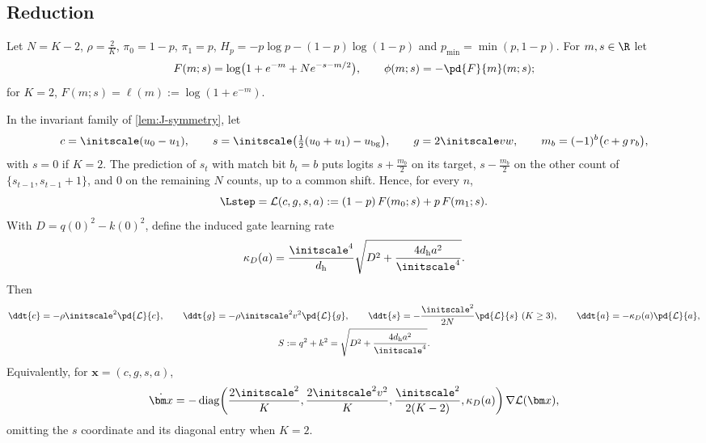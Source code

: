 \subsection{Reduction}

Let $N=K-2$, $\rho=\frac{2}{K}$, $\pi_0=1-p$, $\pi_1=p$, $H_p=-p\log p-(1-p)\log(1-p)$ and $p_{\min}=\min(p,1-p)$. For $m,s\in\R$ let
\[
 F(m;s)=\log\bigl(1+e^{-m}+N e^{-s-m/2}\bigr),\qquad \phi(m;s)=-\pd{F}{m}(m;s);
\]
for $K=2$, $F(m;s)=\ell(m):=\log(1+e^{-m})$.

\begin{lemma}
\label{lem:J-reduce}
In the invariant family of \cref{lem:J-symmetry}, let
\[
 c=\initscale(u_0-u_1),\qquad s=\initscale\bigl(\tfrac{1}{2}(u_0+u_1)-u_{\mathrm{bg}}\bigr),\qquad g=2\initscale vw,\qquad m_b=(-1)^b\bigl(c+g\,r_b\bigr),
\]
with $s=0$ if $K=2$. The prediction of $s_t$ with match bit $b_t=b$ puts logits $s+\frac{m_b}{2}$ on its target, $s-\frac{m_b}{2}$ on the other count of
$\{s_{t-1},s_{t-1}+1\}$, and $0$ on the remaining $N$ counts, up to a common shift. Hence, for every $n$,
\[
 \Lstep=\mathcal L(c,g,s,a):=(1-p)\,F(m_0;s)+p\,F(m_1;s).
\]
With $D=q(0)^2-k(0)^2$, define the induced gate learning rate
\[
 \kappa_D(a)=\frac{\initscale^4}{d_{\mathrm h}}\sqrt{D^2+\frac{4d_{\mathrm h}a^2}{\initscale^4}}.
\]
Then
\begin{equation}
 \begin{gathered}
 \ddt{c}=-\rho\initscale^2\pd{\mathcal L}{c},\qquad \ddt{g}=-\rho\initscale^2v^2\pd{\mathcal L}{g},\qquad \ddt{s}=-\frac{\initscale^2}{2N}\pd{\mathcal L}{s}\ (K\ge3),\qquad \ddt{a}=-\kappa_D(a)\pd{\mathcal L}{a},\\
 S:=q^2+k^2=\sqrt{D^2+\frac{4d_{\mathrm h}a^2}{\initscale^4}}.
 \end{gathered}
 \label{eq:J-flow}
\end{equation}
Equivalently, for $\bm x=(c,g,s,a)$,
\[
 \dot{\bm x}=-\operatorname{diag}\!\left(
 \frac{2\initscale^2}{K},\frac{2\initscale^2v^2}{K},
 \frac{\initscale^2}{2(K-2)},\kappa_D(a)\right)\nabla\mathcal L(\bm x),
\]
omitting the $s$ coordinate and its diagonal entry when $K=2$.
\end{lemma}

